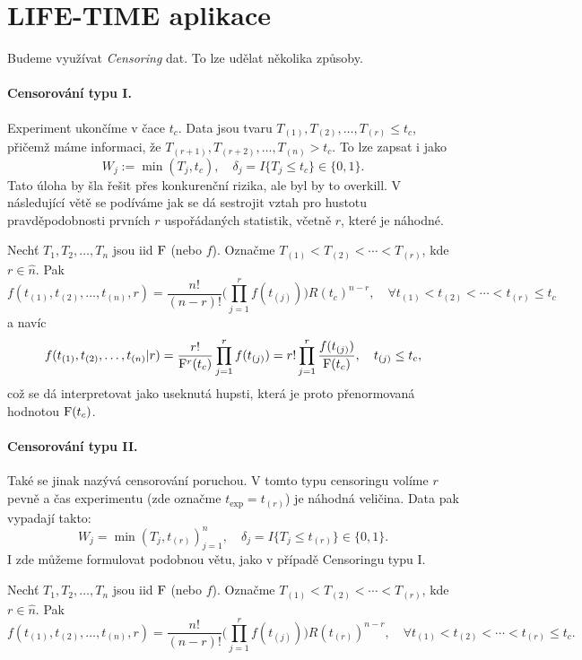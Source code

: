\section{LIFE-TIME aplikace}

    Budeme využívat \emph{Censoring} dat. To lze udělat několika způsoby.

    \paragraph{Censorování typu I.} Experiment ukončíme v čace $t_c$. Data jsou tvaru $T_{(1)},T_{(2)},\dots, T_{(r)} \leq t_c$, přičemž máme informaci, že $T_{(r+1)},T_{(r+2)},\dots, T_{(n)} > t_c$. To lze zapsat i jako
    $$W_j := \min(T_j,t_c), \quad \delta_j = I\lbrace T_j \leq t_c \rbrace \in\{0,1\}.$$
    Tato úloha by šla řešit přes konkurenční rizika, ale byl by to overkill. V následující větě se podíváme jak se dá sestrojit vztah pro hustotu pravděpodobnosti prvních $r$ uspořádaných statistik, včetně $r$, které je náhodné.
    
    \begin{theorem}
        Nechť $T_1, T_2, \dots, T_n$ jsou iid $\mathrm{F}$ (nebo $f$). Označme $T_{(1)} < T_{(2)} < \cdots <T_{(r)}$, kde $r\in\widehat{n}$. Pak 
        $$f(t_{(1)}, t_{(2)}, \dots, t_{(n)}, r) = \frac{n!}{(n-r)!}\Big(\prod_{j=1}^r f(t_{(j)})\Big)R(t_c)^{n-r}, \quad  \forall t_{(1)} < t_{(2)} < \cdots <t_{(r)} \leq t_c $$ 
        a navíc
        $$f(t_{(1)}, t_{(2)}, \dots, t_{(n)} |r) = \frac{r!}{\mathrm{F}^r(t_c)}\prod_{j=1}^r f(t_{(j)}) = r! \prod_{j=1}^r  \frac{f(t_{(j)})}{\mathrm{F}(t_{c})}, \quad  t_{(j)} \leq t_c,$$ 
        což se dá interpretovat jako useknutá hupsti, která je proto přenormovaná hodnotou $\mathrm{F}(t_{c})$.
    \end{theorem}

    \paragraph{Censorování typu II.}
    Také se jinak nazývá censorování poruchou. V tomto typu censoringu volíme $r$ pevně a čas experimentu (zde označme $t_{\mathrm{exp}} = t_{(r)}$) je náhodná veličina. Data pak vypadají takto: 
    $$W_j = \min(T_j, t_{(r)})_{j=1}^n,\quad \delta_j = I\lbrace T_j \leq t_{(r)} \rbrace \in \{0,1\}. $$
    I zde můžeme formulovat podobnou větu, jako v případě Censoringu typu I.
    
    \begin{theorem}
        Nechť $T_1, T_2, \dots, T_n$ jsou iid $\mathrm{F}$ (nebo $f$). Označme $T_{(1)} < T_{(2)} < \cdots <T_{(r)}$, kde $r\in\widehat{n}$. 
        Pak $$f(t_{(1)}, t_{(2)}, \dots, t_{(n)}, r) = \frac{n!}{(n-r)!}\Big(\prod_{j=1}^r f(t_{(j)})\Big)R(t_{(r)})^{n-r}, \quad  \forall t_{(1)} < t_{(2)} < \cdots <t_{(r)} \leq t_c. $$ 
    \end{theorem}
    
